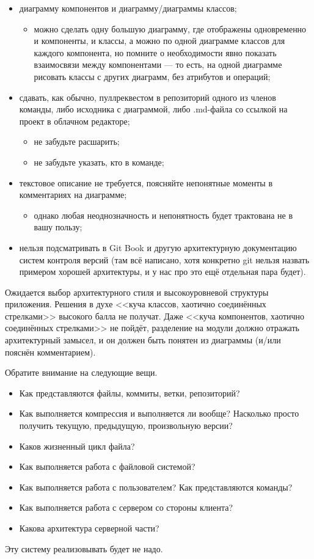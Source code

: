 \documentclass[a5paper]{homework}
\begin{document}
\begin{itemize}
    \item диаграмму компонентов и диаграмму/диаграммы классов;
    \begin{itemize}
        \item можно сделать одну большую диаграмму, где отображены одновременно и компоненты, и классы, а можно по одной диаграмме классов для каждого компонента, но помните о необходимости явно показать взаимосвязи между компонентами --- то есть, на одной диаграмме рисовать классы с других диаграмм, без атрибутов и операций;
    \end{itemize}
    \item сдавать, как обычно, пуллреквестом в репозиторий одного из членов команды, либо исходника с диаграммой, либо .md-файла со ссылкой на проект в облачном редакторе;
    \begin{itemize}
        \item не забудьте расшарить;
        \item не забудьте указать, кто в команде;
    \end{itemize}
    \item текстовое описание не требуется, поясняйте непонятные моменты в комментариях на диаграмме;
    \begin{itemize}
        \item однако любая неоднозначность и непонятность будет трактована не в вашу пользу;
    \end{itemize}
    \item нельзя подсматривать в Git Book и другую архитектурную документацию систем контроля версий (там всё написано, хотя конкретно git нельзя назвать примером хорошей архитектуры, и у нас про это ещё отдельная пара будет).
\end{itemize}

Ожидается выбор архитектурного стиля и высокоуровневой структуры приложения. Решения в духе <<куча классов, хаотично соединённых стрелками>> высокого балла не получат. Даже <<куча компонентов, хаотично соединённых стрелками>> не пойдёт, разделение на модули должно отражать архитектурный замысел, и он должен быть понятен из диаграммы (и/или пояснён комментарием).

Обратите внимание на следующие вещи.

\begin{itemize}
    \item Как представляются файлы, коммиты, ветки, репозиторий?
    \item Как выполняется компрессия и выполняется ли вообще? Насколько просто получить текущую, предыдущую, произвольную версии?
    \item Каков жизненный цикл файла?
    \item Как выполняется работа с файловой системой?
    \item Как выполняется работа с пользователем? Как представляются команды?
    \item Как выполняется работа с сервером со стороны клиента?
    \item Какова архитектура серверной части?
\end{itemize}

Эту систему реализовывать будет не надо.
\end{document}
